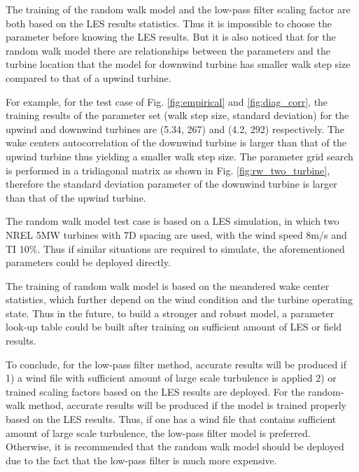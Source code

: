 \documentclass{umthesis}
\begin{document}
The training of the random walk model and the low-pass filter scaling factor are both based on the LES results statistics. Thus it is impossible to choose the parameter before knowing the LES results. But it is also noticed that for the random walk model there are relationships between the parameters and the turbine location that the model for downwind turbine has smaller walk step size compared to that of a upwind turbine.

For example, for the test case of Fig. \ref{fig:empirical} and \ref{fig:diag_corr}, the training results of the parameter set (walk step size, standard deviation) for the upwind and downwind turbines are (5.34, 267) and (4.2, 292) respectively. The wake centers autocorrelation of the downwind turbine is larger than that of the upwind turbine thus yielding a smaller walk step size. The parameter grid search is performed in a tridiagonal matrix as shown in Fig. \ref{fig:rw_two_turbine}, therefore the standard deviation parameter of the downwind turbine is larger than that of the upwind turbine.

The random walk model test case is based on a LES simulation, in which two NREL 5MW turbines with 7D spacing are used, with the wind speed 8m/s and TI 10\%. Thus if similar situations are required to simulate, the aforementioned parameters could be deployed directly.

The training of random walk model is based on the meandered wake center statistics, which further depend on the wind condition and the turbine operating state. Thus in the future, to build a stronger and robust model, a parameter look-up table could be built after training on sufficient amount of LES or field results.

To conclude, for the low-pass filter method, accurate results will be produced if 1) a wind file with sufficient amount of large scale turbulence is applied 2) or trained scaling factors based on the LES results are deployed. For the random-walk method, accurate results will be produced if the model is trained properly based on the LES results. Thus, if one has a wind file that contains sufficient amount of large scale turbulence, the low-pass filter model is preferred. Otherwise, it is recommended that the random walk model should be deployed due to the fact that the low-pass filter is much more expensive.
\end{document}
